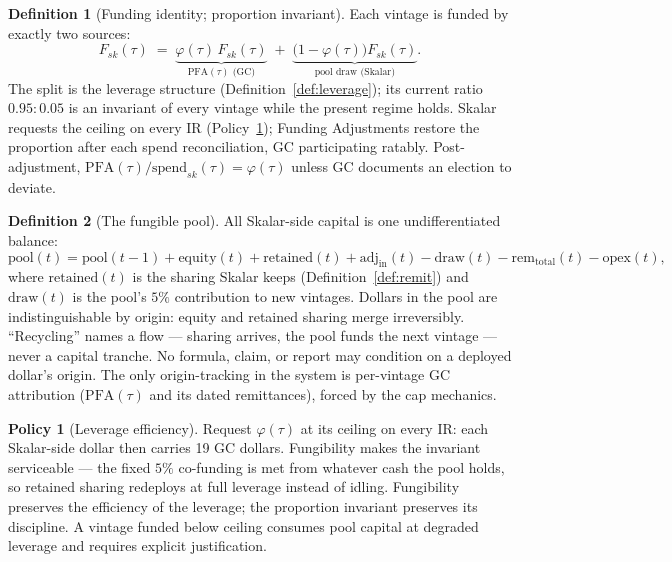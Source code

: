 \documentclass[11pt, a4paper]{article}
\theoremstyle{definition}
\newtheorem{definition}{Definition}[section]
\newtheorem{policy}{Policy}
\newcommand{\PFA}{\mathrm{PFA}}                   %
\newcommand{\rem}{\mathrm{rem}}                   %
\newcommand{\pool}{\mathrm{pool}}                 %
\newcommand{\spend}{\mathrm{spend}}               %
\begin{document}
\begin{definition}[Funding identity; proportion invariant]\label{def:identity}
Each vintage is funded by exactly two sources:
\begin{equation}
F_{sk}(\tau) \;=\; \underbrace{\varphi(\tau)\, F_{sk}(\tau)}_{\PFA(\tau) \text{ (GC)}} \;+\; \underbrace{\bigl(1 - \varphi(\tau)\bigr) F_{sk}(\tau)}_{\text{pool draw (Skalar)}} .
\end{equation}
The split is the leverage structure (Definition~\ref{def:leverage}); its current ratio $0.95 : 0.05$ is an invariant of every vintage while the present regime holds. Skalar requests the ceiling on every IR (Policy~\ref{pol:leverage}); Funding Adjustments restore the proportion after each spend reconciliation, GC participating ratably. Post-adjustment, $\PFA(\tau)/\spend_{sk}(\tau) = \varphi(\tau)$ unless GC documents an election to deviate.
\end{definition}

\begin{definition}[The fungible pool]\label{def:pool}
All Skalar-side capital is one undifferentiated balance:
\begin{equation}
\pool(t) = \pool(t{-}1) + \mathrm{equity}(t) + \mathrm{retained}(t) + \mathrm{adj_{in}}(t) - \mathrm{draw}(t) - \rem_{\mathrm{total}}(t) - \mathrm{opex}(t),
\end{equation}
where $\mathrm{retained}(t)$ is the sharing Skalar keeps (Definition~\ref{def:remit}) and $\mathrm{draw}(t)$ is the pool's $5\%$ contribution to new vintages. Dollars in the pool are indistinguishable by origin: equity and retained sharing merge irreversibly. ``Recycling'' names a flow --- sharing arrives, the pool funds the next vintage --- never a capital tranche. No formula, claim, or report may condition on a deployed dollar's origin. The only origin-tracking in the system is per-vintage GC attribution ($\PFA(\tau)$ and its dated remittances), forced by the cap mechanics.
\end{definition}

\begin{policy}[Leverage efficiency]\label{pol:leverage}
Request $\varphi(\tau)$ at its ceiling on every IR: each Skalar-side dollar then carries 19 GC dollars. Fungibility makes the invariant serviceable --- the fixed $5\%$ co-funding is met from whatever cash the pool holds, so retained sharing redeploys at full leverage instead of idling. Fungibility preserves the efficiency of the leverage; the proportion invariant preserves its discipline. A vintage funded below ceiling consumes pool capital at degraded leverage and requires explicit justification.
\end{policy}
\end{document}
